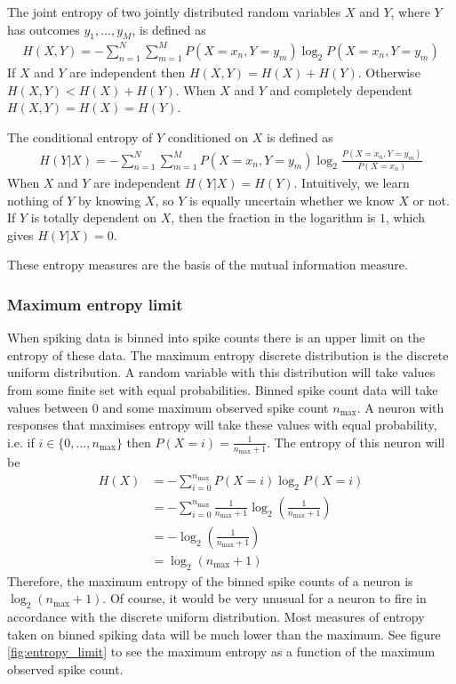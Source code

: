 \documentclass[a4paper,12pt]{article}
\theoremstyle{definition}
\begin{document}
        The joint entropy of two jointly distributed random variables $X$ and $Y$, where $Y$ has outcomes $y_1, \dots, y_M$, is defined as
        \begin{align}\label{joint_entropy}
        H(X, Y) = -\sum_{n=1}^N \sum_{m=1}^M P(X=x_n, Y=y_m) \log _2 P(X=x_n, Y=y_m)
        \end{align}
        If $X$ and $Y$ are independent then $H(X,Y) = H(X) + H(Y)$. Otherwise $H(X,Y) < H(X) + H(Y)$. When $X$ and $Y$ and completely dependent $H(X,Y) = H(X) = H(Y)$.

        The conditional entropy of $Y$ conditioned on $X$ is defined as
        \begin{align}
        H(Y|X) = -\sum_{n=1}^N \sum_{m=1}^M P(X=x_n, Y=y_m) \log _2 \frac{P(X=x_n, Y=y_m)}{P(X=x_n)}
        \end{align}
        When $X$ and $Y$ are independent $H(Y|X) = H(Y)$. Intuitively, we learn nothing of $Y$ by knowing $X$, so $Y$ is equally uncertain whether we know $X$ or not. If $Y$ is totally dependent on $X$, then the fraction in the logarithm is $1$, which gives $H(Y|X) = 0$.

        These entropy measures are the basis of the mutual information measure.

        \subsubsection{Maximum entropy limit}\label{sec:entropy_limit}
        When spiking data is binned into spike counts there is an upper limit on the entropy of these data. The maximum entropy discrete distribution is the discrete uniform distribution. A random variable with this distribution will take values from some finite set with equal probabilities. Binned spike count data will take values between $0$ and some maximum observed spike count $n_{\max}$. A neuron with responses that maximises entropy will take these values with equal probability, i.e. if $i \in \lbrace 0, \dots, n_{\max} \rbrace$ then $P(X = i) = \frac{1}{n_{\max} + 1}$. The entropy of this neuron will be
        \begin{align*}
          H(X)  &= - \sum_{i=0}^{n_{\max}} P(X = i) \log _2 P(X=i) \\
                &= - \sum_{i=0}^{n_{\max}} \frac{1}{n_{\max} + 1} \log_2 \left( \frac{1}{n_{\max} + 1} \right) \\
                &= - \log_2 \left( \frac{1}{n_{\max} + 1} \right) \\
                &= \log_2 \left( n_{\max} + 1 \right)
        \end{align*}
        Therefore, the maximum entropy of the binned spike counts of a neuron is $\log _2 \left( n_{\max} + 1 \right)$. Of course, it would be very unusual for a neuron to fire in accordance with the discrete uniform distribution. Most measures of entropy taken on binned spiking data will be much lower than the maximum. See figure \ref{fig:entropy_limit} to see the maximum entropy as a function of the maximum observed spike count.
\end{document}
